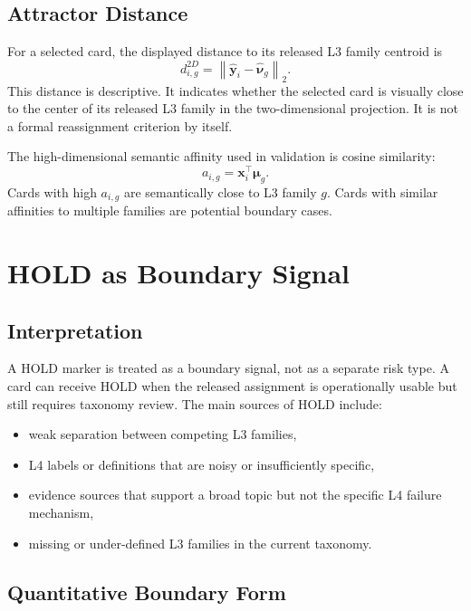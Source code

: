 \documentclass[11pt,a4paper]{article}
\begin{document}
\subsection{Attractor Distance}

For a selected card, the displayed distance to its released L3 family centroid is
\begin{equation}
d^{2D}_{i,g}=\left\|\hat{\mathbf{y}}_i-\hat{\boldsymbol{\nu}}_g\right\|_2.
\end{equation}
This distance is descriptive. It indicates whether the selected card is visually close to the center of its released L3 family in the two-dimensional projection. It is not a formal reassignment criterion by itself.

The high-dimensional semantic affinity used in validation is cosine similarity:
\begin{equation}
a_{i,g} = \mathbf{x}_i^\top \boldsymbol{\mu}_g.
\end{equation}
Cards with high $a_{i,g}$ are semantically close to L3 family $g$. Cards with similar affinities to multiple families are potential boundary cases.

\section{HOLD as Boundary Signal}

\subsection{Interpretation}

A HOLD marker is treated as a boundary signal, not as a separate risk type. A card can receive HOLD when the released assignment is operationally usable but still requires taxonomy review. The main sources of HOLD include:
\begin{itemize}
  \item weak separation between competing L3 families,
  \item L4 labels or definitions that are noisy or insufficiently specific,
  \item evidence sources that support a broad topic but not the specific L4 failure mechanism,
  \item missing or under-defined L3 families in the current taxonomy.
\end{itemize}

\subsection{Quantitative Boundary Form}
\end{document}
